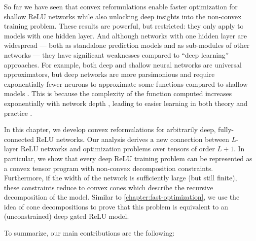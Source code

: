 
So far we have seen that convex reformulations enable faster optimization for
shallow ReLU networks while also unlocking deep insights into the non-convex
training problem.
These results are powerful, but restricted: they only apply to
models with one hidden layer.
And although networks with one hidden layer are widespread --- both as
standalone prediction models and as sub-modules of other networks --- they have
significant weaknesses compared to ``deep learning'' approaches.
For example, both deep and shallow neural networks are universal approximators,
but deep networks are more parsimonious and require exponentially fewer neurons
to approximate some functions compared to shallow models
\citep{telgarsky2016deep, edlan2016deep}.
This is because the complexity of the function computed increases exponentially
with network depth \citep{raghu2017depth}, leading to easier learning in
both theory and practice \citep{safran2017tradeoff, larochelle2009exploring}.

In this chapter, we develop convex reformulations for arbitrarily deep,
fully-connected ReLU networks.
Our analysis derives a new connection between \( L \)-layer ReLU networks and
optimization problems over tensors of order \( L+1 \).
In particular, we show that every deep ReLU training problem can be represented
as a convex tensor program with non-convex decomposition constraints.
Furthermore, if the width of the network is sufficiently large (but still
finite), these constraints reduce to convex cones which describe the recursive
decomposition of the model.
Similar to \cref{chapter:fast-optimization}, we use the idea of cone
decompositions to prove that this problem is equivalent to an (unconstrained)
deep gated ReLU model.

To summarize, our main contributions are the following:

